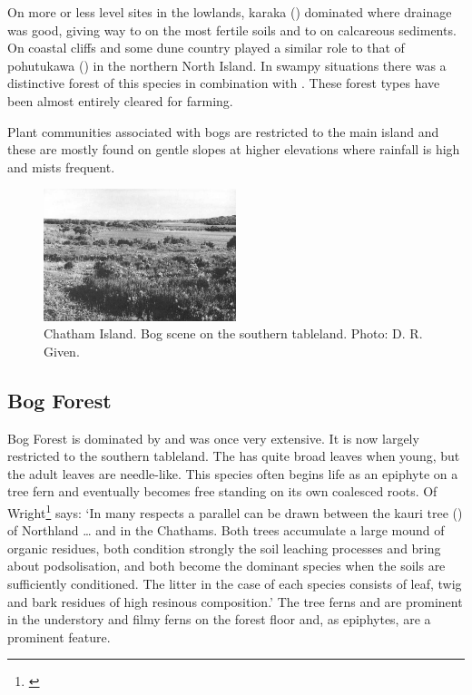 On more or less level sites in the lowlands, karaka () dominated where drainage was good, giving way to  on the most fertile soils and to  on calcareous sediments.
On coastal cliffs and some dune country  played a similar role to that of pohutukawa () in the northern North Island.
In swampy situations there was a distinctive forest of this species in combination with .
These forest types have been almost entirely cleared for farming.

Plant communities associated with bogs are restricted to the main island and these are mostly found on gentle slopes at higher elevations where rainfall is high and mists frequent.

\begin{figure}
	\includegraphics[width=0.5\textwidth]{graphics/figure119chatham-island-bog.jpg}
	\centering
	\caption[Chatham Island bog scene]{Chatham Island.
    Bog scene on the southern tableland.
	Photo: D. R. Given.}
	\label{fig:119chatham-island-bog}
\end{figure}

\subsection{Bog Forest}

Bog Forest is dominated by  and was once very extensive.
It is now largely restricted to the southern tableland.
The  has quite broad leaves when young, but the adult leaves are needle-like.
This species often begins life as an epiphyte on a tree fern and eventually becomes free standing on its own coalesced roots.
Of  Wright\footnote{\cite{wright1959soils}} says: `In many respects a parallel can be drawn between the kauri tree () of Northland … and  in the Chathams.
Both trees accumulate a large mound of organic residues, both condition strongly the soil leaching processes and bring about podsolisation, and both become the dominant species when the soils are sufficiently conditioned.
The litter in the case of each species consists of leaf, twig and bark residues of high resinous composition.' The tree ferns  and  are prominent in the understory and filmy ferns on the forest floor and, as epiphytes, are a prominent feature.

